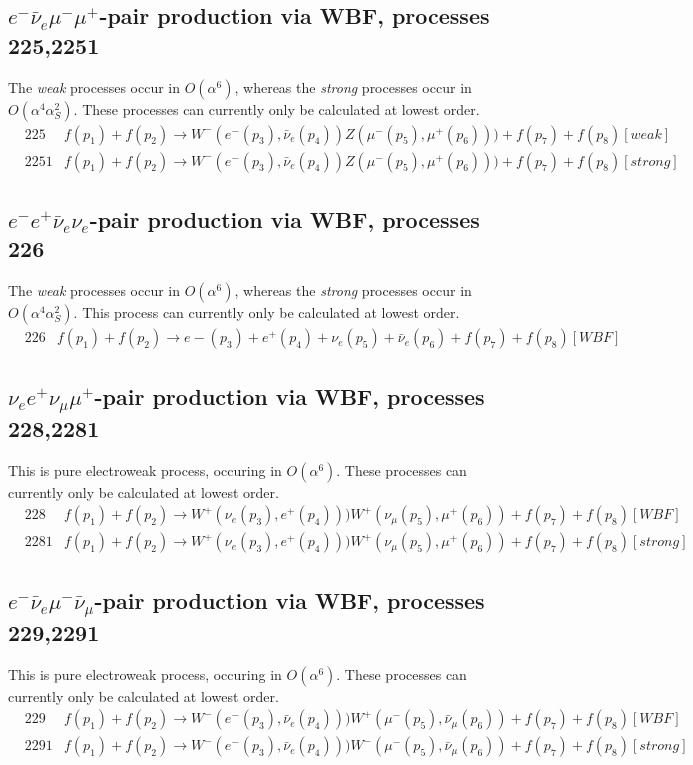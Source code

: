 \documentclass[12pt]{article}
\begin{document}
\subsection{$e^- \bar\nu_{e} \mu^- \mu^+$-pair production via WBF, processes 225,2251}
The {\it weak} processes occur in $O(\alpha^6)$, whereas the {\it strong} processes occur in $O(\alpha^4 \alpha_S^2)$.
These processes can currently only be calculated at lowest order.
\begin{eqnarray}
&225   & f(p_1)+f(p_2) \to W^-(e^-(p_3),\bar{\nu}_e(p_4))Z(\mu^-(p_5),\mu^+(p_6)))+f(p_7)+f(p_8) [weak]    \nonumber \\
&2251  &  f(p_1)+f(p_2) \to W^-(e^-(p_3),\bar{\nu}_e(p_4))Z(\mu^-(p_5),\mu^+(p_6)))+f(p_7)+f(p_8) [strong]  \nonumber  
\end{eqnarray}


\subsection{$e^- e^+ \bar\nu_{e} \nu_{e}$-pair production via WBF, processes 226}
The {\it weak} processes occur in $O(\alpha^6)$, whereas the {\it strong} processes occur in $O(\alpha^4 \alpha_S^2)$.
This process can currently only be calculated at lowest order.
\begin{eqnarray}
&226  &  f(p_1)+f(p_2) \to e-(p_3)+e^+(p_4)+\nu_e(p_5)+\bar{\nu}_e(p_6)+f(p_7)+f(p_8) [WBF]    \nonumber
\end{eqnarray}

\subsection{$\nu_{e} e^+ \nu_{\mu} \mu^+ $-pair production via WBF, processes 228,2281}
This is pure electroweak process, occuring in $O(\alpha^6)$.
These processes can currently only be calculated at lowest order.
\begin{eqnarray}
&228  &  f(p_1)+f(p_2) \to W^+(\nu_e(p_3),e^+(p_4)))W^+(\nu_\mu(p_5),\mu^+(p_6))+f(p_7)+f(p_8) [WBF]    \nonumber \\
&2281 &  f(p_1)+f(p_2) \to W^+(\nu_e(p_3),e^+(p_4)))W^+(\nu_\mu(p_5),\mu^+(p_6))+f(p_7)+f(p_8) [strong]     \nonumber
\end{eqnarray}
\subsection{$e^- \bar{\nu}_{e} \mu^- \bar{\nu}_{\mu} $-pair production via WBF, processes 229,2291}
This is pure electroweak process, occuring in $O(\alpha^6)$.
These processes can currently only be calculated at lowest order.
\begin{eqnarray}
& 229 &   f(p_1)+f(p_2) \to W^-(e^-(p_3),\bar{\nu}_e(p_4)))W^+(\mu^-(p_5),\bar{\nu}_\mu(p_6))+f(p_7)+f(p_8) [WBF]   \nonumber \\
&2291 &  f(p_1)+f(p_2) \to W^-(e^-(p_3),\bar{\nu}_e(p_4)))W^-(\mu^-(p_5),\bar{\nu}_\mu(p_6))+f(p_7)+f(p_8) [strong]  \nonumber  
\end{eqnarray}
\end{document}

